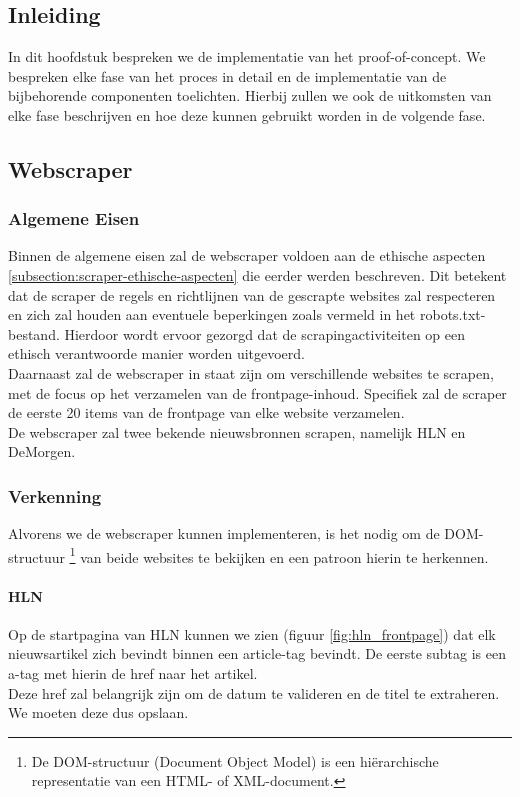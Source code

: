 \chapter{}%
\label{ch:proof-of-concept}
\section{Inleiding}
In dit hoofdstuk bespreken we de implementatie van het proof-of-concept. We bespreken elke fase van het proces in detail en de implementatie van de bijbehorende componenten toelichten. Hierbij zullen we ook de uitkomsten van elke fase beschrijven en hoe deze kunnen gebruikt worden in de volgende fase. 

\section{Webscraper}
\subsection{Algemene Eisen}
Binnen de algemene eisen zal de webscraper voldoen aan de ethische aspecten \ref{subsection:scraper-ethische-aspecten} die eerder werden beschreven. Dit betekent dat de scraper de regels en richtlijnen van de gescrapte websites zal respecteren en zich zal houden aan eventuele beperkingen zoals vermeld in het robots.txt-bestand. Hierdoor wordt ervoor gezorgd dat de scrapingactiviteiten op een ethisch verantwoorde manier worden uitgevoerd. \\

Daarnaast zal de webscraper in staat zijn om verschillende websites te scrapen, met de focus op het verzamelen van de frontpage-inhoud. Specifiek zal de scraper de eerste 20 items van de frontpage van elke website verzamelen. \\

De webscraper zal twee bekende nieuwsbronnen scrapen, namelijk HLN en DeMorgen.

\subsection{Verkenning}
Alvorens we de webscraper kunnen implementeren, is het nodig om de DOM-structuur \footnote{De DOM-structuur (Document Object Model) is een hiërarchische representatie van een HTML- of XML-document.} van beide websites te bekijken en een patroon hierin te herkennen. 
\subsubsection{HLN}
Op de startpagina van HLN kunnen we zien (figuur \ref{fig:hln_frontpage}) dat elk nieuwsartikel zich bevindt binnen een article-tag bevindt. De eerste subtag is een a-tag met hierin de href naar het artikel. \\ Deze href zal belangrijk zijn om de datum te valideren en de titel te extraheren. We moeten deze dus opslaan. 

